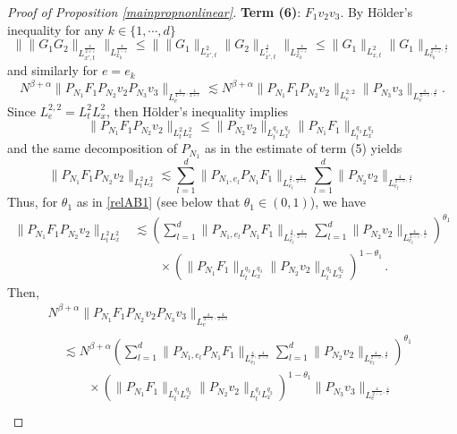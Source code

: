 \documentclass[10pt,leqno]{amsart}
\numberwithin{equation}{section}
\begin{document}
\begin{proof}[Proof of Proposition \ref{mainpropnonlinear}]
\textbf{Term (6)}: $F_1 v_2 v_3$.
By H\"older's inequality for any $k \in \{1, \cdots, d\}$
$$
\|\|G_1 G_2\|_{L^{\frac{4}{2+\varepsilon}}_{x',t}}\|_{L^{\frac{4}{4-\varepsilon}}_{x_k}} \leq \| \|G_1\|_{L^2_{x',t}} \|G_2\|_{L^{\frac{4}{\varepsilon}}_{x',t}} \|_{L^{\frac{4}{4-\varepsilon}}_{x_k}}
\leq \|G_1\|_{L^2_{x, t}} \|G_1\|_{L^{\frac{4}{2-\varepsilon} ,\frac{4}{\varepsilon}}_{e_k}}
$$
and similarly for $e = e_k$
$$N^{\beta +\alpha} \|P_{N_1}F_1 P_{N_2} v_2 P_{N_3} v_3\|_{L^{\frac{4}{4-\varepsilon} ,\frac{4}{2+\varepsilon}}_e} \lesssim  
N^{\beta +\alpha} \|P_{N_1}F_1 P_{N_2} v_2\|_{L^{2,2}_e}  \|P_{N_3} v_3\|_{L^{\frac{4}{2-\varepsilon} ,\frac{4}{\varepsilon}}_e}. $$
Since $L_e^{2,2}=L_t^2 L_x^2$, then H\"older's inequality  implies
$$
 \|P_{N_1}F_1 P_{N_2} v_2\|_{L_t^2 L_x^2} \leq  \|P_{N_2} v_2\|_{L_t^{q_2} L_x^{q_2}} \|P_{N_1}F_1 \|_{L_t^{q_3} L_x^{q_3}}
$$
and the same decomposition of $P_{N_1}$ as in the estimate of term (5) yields
$$
 \|P_{N_1}F_1 P_{N_2} v_2\|_{L_t^2 L_x^2} \lesssim \sum_{l=1}^d \|P_{N_1 ,e_l}P_{N_1} F_1\|_{L_{e_l}^{\frac{4}{\varepsilon} ,\frac{4}{2-\varepsilon}}}  \sum_{l=1}^d\|P_{N_2}v_2\|_{L_{e_l}^{\frac{4}{2-\varepsilon} ,\frac{4}{\varepsilon}}}
$$
Thus, for $\theta_1$ as in  \eqref{relAB1} (see below that $\theta_1 \in (0, 1)$), we have 
\begin{align*}
 \|P_{N_1}F_1 P_{N_2} v_2\|_{L_t^2 L_x^2} &\lesssim 
 \left(\sum_{l=1}^d \|P_{N_1 ,e_l}P_{N_1} F_1\|_{L_{e_l}^{\frac{4}{\varepsilon} ,\frac{4}{2-\varepsilon}}}  \sum_{l=1}^d\|P_{N_2}v_2\|_{L_{e_l}^{\frac{4}{2-\varepsilon} ,\frac{4}{\varepsilon}}} \right)^{\theta_1} \\
& \qquad \times \left( \|P_{N_1}F_1 \|_{L_t^{q_3} L_x^{q_3}} \|P_{N_2} v_2\|_{L_t^{q_2} L_x^{q_2}} \right)^{1-\theta_1} \,.
\end{align*}
Then, 
\begin{multline*}
N^{\beta +\alpha}  \|P_{N_1}F_1 P_{N_2} v_2 P_{N_3} v_3\|_{L^{\frac{4}{4-\varepsilon} ,\frac{4}{2+\varepsilon}}_e} \\
\begin{aligned}
&\lesssim  N^{\beta +\alpha}  \left
(\sum_{l=1}^d \|P_{N_1 ,e_l}P_{N_1} F_1\|_{L_{e_l}^{\frac{4}{\varepsilon} ,\frac{4}{2-\varepsilon}}}  \sum_{l=1}^d\|P_{N_2}v_2\|_{L_{e_l}^{\frac{4}{2-\varepsilon} ,\frac{4}{\varepsilon}}} \right)^{\theta_1} \\
&\qquad \times ( \| P_{N_1} F_1 \|_{L_t^{q_3} L_x^{q_3}} \|P_{N_2} v_2\|_{L_t^{q_2} L_x^{q_2}})^{1-\theta_1}  \|P_{N_3} v_3\|_{L^{\frac{4}{2-\varepsilon} ,\frac{4}{\varepsilon}}_e}\\

\end{aligned}
\end{multline*}
\end{proof}
\end{document}
